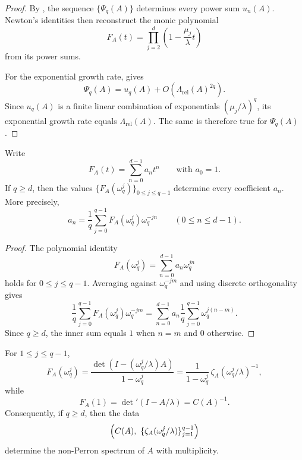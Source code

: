 \begin{proof}
  By , the sequence
  \(\{\Psi_q(A)\}\) determines every power sum \(u_n(A)\). Newton's
  identities then reconstruct the monic polynomial
  \[
    F_A(t)=\prod_{j=2}^d\left(1-\frac{\mu_j}{\lambda}t\right)
  \]
  from its power sums.

  For the exponential growth rate,
   gives
  \[
    \Psi_q(A)=u_q(A)+O(\Lambda_{\mathrm{rel}}(A)^{2q}).
  \]
  Since \(u_q(A)\) is a finite linear combination of exponentials
  \((\mu_j/\lambda)^q\), its exponential growth rate equals
  \(\Lambda_{\mathrm{rel}}(A)\). The same is therefore true for
  \(\Psi_q(A)\).
\end{proof}

\begin{theorem}
  \label{thm:finite-part-cyclic-lift-single-q-torsion-reconstruction}
  Write
  \[
    F_A(t)=\sum_{n=0}^{d-1}a_n t^n
    \qquad\text{with } a_0=1.
  \]
  If \(q\ge d\), then the values
  \(\{F_A(\omega_q^j)\}_{0\le j\le q-1}\) determine every coefficient
  \(a_n\). More precisely,
  \[
    a_n=\frac{1}{q}\sum_{j=0}^{q-1}
      F_A(\omega_q^j)\omega_q^{-jn}
    \qquad (0\le n\le d-1).
  \]
\end{theorem}

\begin{proof}
  The polynomial identity
  \[
    F_A(\omega_q^j)=\sum_{n=0}^{d-1}a_n\omega_q^{jn}
  \]
  holds for \(0\le j\le q-1\). Averaging against
  \(\omega_q^{-jm}\) and using discrete orthogonality gives
  \[
    \frac{1}{q}\sum_{j=0}^{q-1}
      F_A(\omega_q^j)\omega_q^{-jm}
    =\sum_{n=0}^{d-1}a_n
      \frac{1}{q}\sum_{j=0}^{q-1}\omega_q^{j(n-m)}.
  \]
  Since \(q\ge d\), the inner sum equals \(1\) when \(n=m\) and \(0\)
  otherwise.
\end{proof}

\begin{corollary}
  \label{cor:finite-part-cyclic-lift-zeta-torsion-determines-spectrum}
  For \(1\le j\le q-1\),
  \[
    F_A(\omega_q^j)
    =\frac{\det(I-(\omega_q^j/\lambda)A)}{1-\omega_q^j}
    =\frac{1}{1-\omega_q^j}\,
      \zeta_A(\omega_q^j/\lambda)^{-1},
  \]
  while
  \[
    F_A(1)=\det\nolimits'(I-A/\lambda)=C(A)^{-1}.
  \]
  Consequently, if \(q\ge d\), then the data
  \[
    \Bigl(C(A),\ \{\zeta_A(\omega_q^j/\lambda)\}_{j=1}^{q-1}\Bigr)
  \]
  determine the non-Perron spectrum of \(A\) with multiplicity.
\end{corollary}

